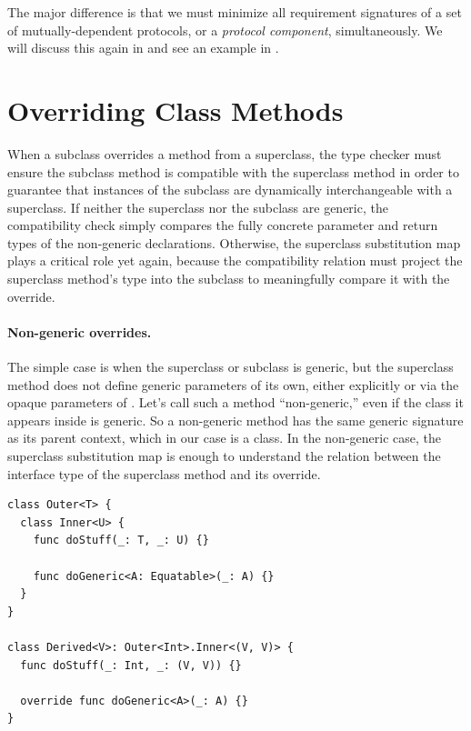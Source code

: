 \documentclass[../generics]{subfiles}
\begin{document}
The major difference is that we must minimize all requirement signatures of a set of mutually-dependent protocols, or a \emph{protocol component}, simultaneously. We will discuss this again in  and see an example in .

\ifWIP

\section{Overriding Class Methods}\label{sec:overriding class methods}

When a subclass overrides a method from a superclass, the type checker must ensure the subclass method is compatible with the superclass method in order to guarantee that instances of the subclass are dynamically interchangeable with a superclass. If neither the superclass nor the subclass are generic, the compatibility check simply compares the fully concrete parameter and return types of the non-generic declarations. Otherwise, the superclass substitution map plays a critical role yet again, because the compatibility relation must project the superclass method's type into the subclass to meaningfully compare it with the override.

\paragraph{Non-generic overrides.}
The simple case is when the superclass or subclass is generic, but the superclass method does not define generic parameters of its own, either explicitly or via the opaque parameters of . Let's call such a method ``non-generic,'' even if the class it appears inside is generic. So a non-generic method has the same generic signature as its parent context, which in our case is a class. In the non-generic case, the superclass substitution map is enough to understand the relation between the interface type of the superclass method and its override.

\begin{listing}\label{method overrides}
\begin{Verbatim}
class Outer<T> {
  class Inner<U> {
    func doStuff(_: T, _: U) {}

    func doGeneric<A: Equatable>(_: A) {}
  }
}

class Derived<V>: Outer<Int>.Inner<(V, V)> {
  func doStuff(_: Int, _: (V, V)) {}

  override func doGeneric<A>(_: A) {}
}
\end{Verbatim}
\end{listing}
\end{document}
